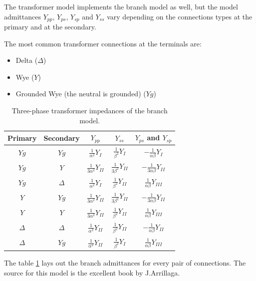\documentclass[nols,a4paper,twoside,notoc,fleqn]{tufte-book}
\begin{document}
The transformer model implements the branch model as well, but the model admittances $Y_{pp}$, $Y_{ps}$, $Y_{sp}$ and $Y_{ss}$ vary depending on the connections types at the primary and at the secondary.

The most common transformer connections at the terminals are:

\begin{itemize}
\item Delta ($\Delta$)
\item Wye ($Y$)
\item Grounded Wye (the neutral is grounded) ($Yg$)
\end{itemize}



\begin{table}[h!]
\begin{center}
\begin{tabular}{ccccc}
\toprule
Primary & Secondary & $Y_{pp}$  & $Y_{ss}$ & $Y_{ps}$ and $Y_{sp}$\\
\midrule
 $Yg$ & $Yg$ 			& $\frac{1}{\alpha^2}Y_I$ 				& $\frac{1}{\beta^2}Y_I$ 		& $-\frac{1}{\alpha\beta}Y_I$\\
 $Yg$ & $Y$ 			& $\frac{1}{3\alpha^2}Y_{II}$			& $\frac{1}{3\beta^2}Y_{II}$	& $-\frac{1}{3\alpha\beta}Y_{II}$	\\
 $Yg$ & $\Delta$  		& $\frac{1}{\alpha^2}Y_I$ 				& $\frac{1}{\beta^2}Y_{II}$ 	& $\frac{1}{\alpha\beta}Y_{III}$	 \\
 $Y$ & $Yg$ 			& $\frac{1}{3\alpha^2}Y_{II}$			& $\frac{1}{3\beta^2}Y_{II}$	& $-\frac{1}{3\alpha\beta}Y_{II}$ \\
 $Y$ & $Y$  			& $\frac{1}{3\alpha^2}Y_{II}$			& $\frac{1}{\beta^2}Y_{II}$ 	& $\frac{1}{\alpha\beta}Y_{III}$	 \\
 $\Delta$ & $\Delta$ 	& $\frac{1}{\alpha^2}Y_{II}$			& $\frac{1}{\beta^2}Y_{II}$		& $-\frac{1}{\alpha\beta}Y_{II}$\\
 $\Delta$ & $Yg$ 		& $\frac{1}{\alpha^2}Y_{II}$			& $\frac{1}{\beta^2}Y_{I}$		& $\frac{1}{\alpha\beta}Y_{III}$\\
\bottomrule
\end{tabular}
\end{center}
  \caption{Three-phase transformer impedances of the branch model.}
  \label{transfoemer_impedances_table}
\end{table}

The table \ref{transfoemer_impedances_table} lays out the branch admittances for every pair of connections. The source for this model is the excellent book by J.Arrillaga\cite{arrillaga1990computer}.
\end{document}
